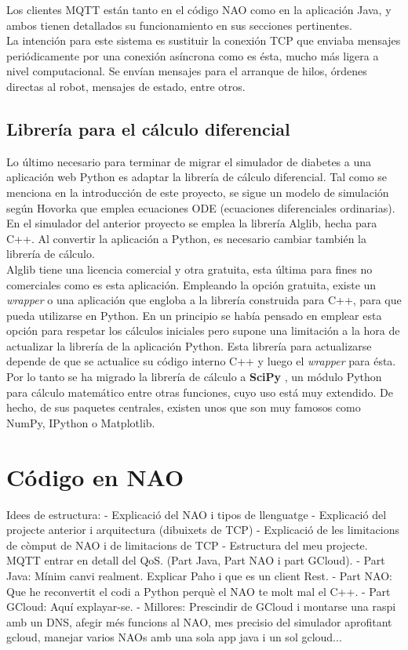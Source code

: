 \documentclass[12pt,spanish,listoffigures,listoftables]{tfgetsinf}
\begin{document}
Los clientes MQTT están tanto en el código NAO como en la aplicación Java, y ambos tienen detallados su funcionamiento en sus secciones pertinentes. \\

La intención para este sistema es sustituir la conexión TCP que enviaba mensajes periódicamente por una conexión asíncrona como es ésta, mucho más ligera a nivel computacional. Se envían mensajes para el arranque de hilos, órdenes directas al robot, mensajes de estado, entre otros.

\section{Librería para el cálculo diferencial}

Lo último necesario para terminar de migrar el simulador de diabetes a una aplicación web Python es adaptar la librería de cálculo diferencial. Tal como se menciona en la introducción de este proyecto, se sigue un modelo de simulación según Hovorka que emplea ecuaciones ODE (ecuaciones diferenciales ordinarias). En el simulador del anterior proyecto se emplea la librería Alglib, hecha para C++. Al convertir la aplicación a Python, es necesario cambiar también la librería de cálculo. \\

Alglib \cite{Alglib} tiene una licencia comercial y otra gratuita, esta última para fines no comerciales como es esta aplicación. Empleando la opción gratuita, existe un \textit{wrapper} o una aplicación que engloba a la librería construida para C++, para que pueda utilizarse en Python. En un principio se había pensado en emplear esta opción para respetar los cálculos iniciales pero supone una limitación a la hora de actualizar la librería de la aplicación Python. Esta librería para actualizarse depende de que se actualice su código interno C++ y luego el \textit{wrapper} para ésta. \\

Por lo tanto se ha migrado la librería de cálculo a \textbf{SciPy} \cite{Scipy}, un módulo Python para cálculo matemático entre otras funciones, cuyo uso está muy extendido. De hecho, de sus paquetes centrales, existen unos que son muy famosos como NumPy, IPython o Matplotlib.

\chapter{Código en NAO}

Idees de estructura:
- Explicació del NAO i tipos de llenguatge
- Explicació del projecte anterior i arquitectura (dibuixets de TCP)
- Explicació de les limitacions de còmput de NAO i de limitacions de TCP
- Estructura del meu projecte. MQTT entrar en detall del QoS. (Part Java, Part NAO i part GCloud).
- Part Java: Mínim canvi realment. Explicar Paho i que es un client Rest.
- Part NAO: Que he reconvertit el codi a Python perquè el NAO te molt mal el C++. 
- Part GCloud: Aquí explayar-se.
- Millores: Prescindir de GCloud i montarse una raspi amb un DNS, afegir més funcions al NAO, mes precisio del simulador aprofitant gcloud, manejar varios NAOs amb una sola app java i un sol gcloud...
\end{document}
